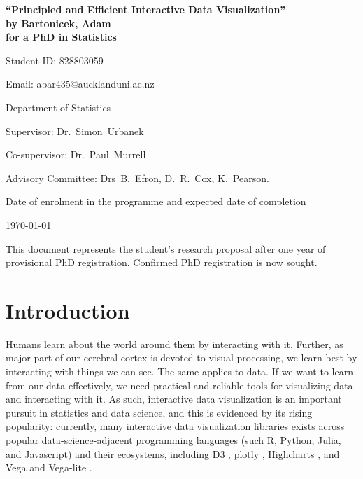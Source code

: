 \documentclass[12pt,a4paper]{article}
\begin{document}
\begin{Large}
\begin{center}
\textbf{``Principled and Efficient Interactive Data Visualization''} \\
\textbf{by Bartonicek, Adam} \\
\textbf{for a PhD in Statistics}
\end{center}
\end{Large}


\hfill{Student ID: 828803059}

\hfill{Email: abar435@aucklanduni.ac.nz}

\hfill{Department of Statistics}

Supervisor: Dr.~Simon~Urbanek

Co-supervisor: Dr.~Paul~Murrell

Advisory Committee: Drs~B.~Efron, D.~R.~Cox, K.~Pearson.



\begin{center}
Date of enrolment in the programme and expected date of completion
\end{center}



\begin{center}
\today
\end{center}



This document represents the student's research proposal after
one year of provisional PhD registration.
Confirmed PhD registration is now sought.




\section{Introduction}
\label{sec:intro}



Humans learn about the world around them by interacting with it. Further, as major part
of our cerebral cortex is devoted to visual processing, we learn best by interacting
with things we can see. The same applies to data. If we want to learn from our 
data effectively, we need practical and reliable tools for visualizing data and interacting with it.
As such, interactive data visualization is an important pursuit in statistics and data science, and this is evidenced by its rising popularity: currently, many interactive data visualization libraries exists across popular data-science-adjacent programming languages (such R, Python, Julia, and Javascript)
and their ecosystems, including D3 \citep{bostock2011}, plotly \citep{plotly2023}, Highcharts \citep{highcharts2023},
and Vega \citep{satyanarayan2015} and Vega-lite \citep{satyanarayan2016}.
\end{document}
